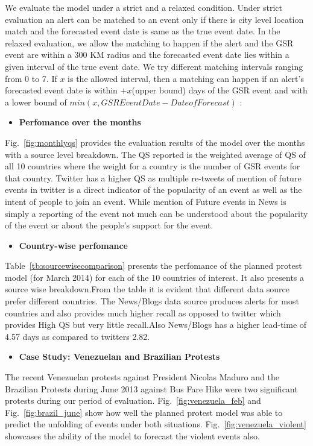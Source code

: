 We evaluate the model under a strict and a relaxed condition. Under strict evaluation an alert can be matched to an event only if there is city level location match and the forecasted event date is same as the true event date. In the relaxed evaluation, we allow the matching to happen if the alert and the GSR event are within a 300 KM radius and the forecasted event date lies within a given interval of the true event date. We try different matching intervals ranging from 0 to 7. If $x$ is the allowed interval, then a matching can happen if an alert's forecasted event date is within $+x$(upper bound) days of the GSR event and with a lower bound of $min(x,GSR Event Date - Date of Forecast)$ :
\begin{itemize}
    \item {\bf Perfomance over the months}
\end{itemize}
    Fig.~\ref{fig:monthlyqs} provides the evaluation results of the model over the months with a source level breakdown. The QS reported is the weighted average of QS of all 10 countries where the weight for a country is the number of GSR events for that country.
    Twitter has a higher QS as multiple re-tweets of mention of future events in twitter is a direct indicator of the popularity of an event as well as the intent of people to join an event. While mention of Future events in News is simply a reporting of the event not much can be understood about the popularity of the event or about the people's support for the event. 
\begin{itemize}
    \item {\bf Country-wise perfomance}
\end{itemize}
    Table~\ref{tb:sourcewisecomparison} presents the perfomance of the planned protest model (for March 2014) for each of the 10 countries of interest. It also presents a source wise breakdown.From the table it is evident that different data source prefer different countries. The News/Blogs data source produces alerts for most countries and also provides much higher recall as opposed to twitter which provides High QS but very little recall.Also News/Blogs has a higher lead-time of 4.57 days as compared to twitters 2.82.

\begin{itemize}
    \item {\bf Case Study: Venezuelan and Brazilian Protests}
\end{itemize}
The recent Venezuelan protests against President Nicolas Maduro and the Brazilian Protests during June 2013 against Bus Fare Hike were two significant protests during our period of evaluation. Fig.~\ref{fig:venezuela_feb} and Fig.~\ref{fig:brazil_june} show how well the planned protest model was able to predict the unfolding of events under both situations. Fig.~\ref{fig:venezuela_violent} showcases the ability of the model to forecast the violent events also.

